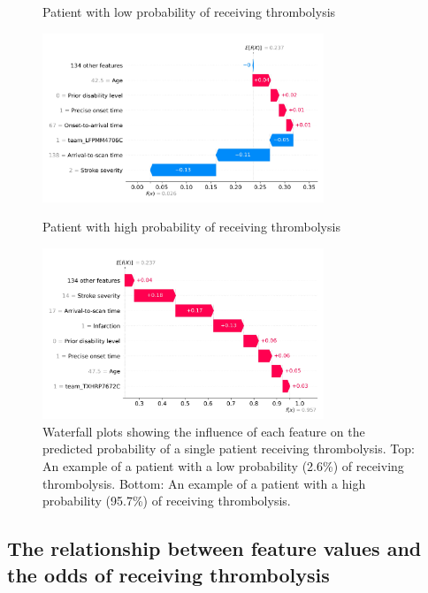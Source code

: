 \begin{figure}%
    \caption*{\footnotesize{\textsf{Patient with low probability of receiving thrombolysis}}}
    \vspace{-4mm} %
    \includegraphics[width=0.75\textwidth]{./images/03_xgb_10_features_waterfall_probability_low}
    \vspace{2mm}
    \caption*{\footnotesize{\textsf{Patient with high probability of receiving thrombolysis}}}
    \vspace{-4mm} %
    \includegraphics[width=0.75\textwidth]{./images/03_xgb_10_features_waterfall_probability_high}
\caption{Waterfall plots showing the influence of each feature on the predicted probability of a single patient receiving thrombolysis. Top: An example of a patient with a low probability (2.6\%) of receiving thrombolysis. Bottom: An example of a patient with a high probability (95.7\%) of receiving thrombolysis.}
\label{fig:results_waterfall}
\end{figure}


\subsection{The relationship between feature values and the odds of receiving thrombolysis}

